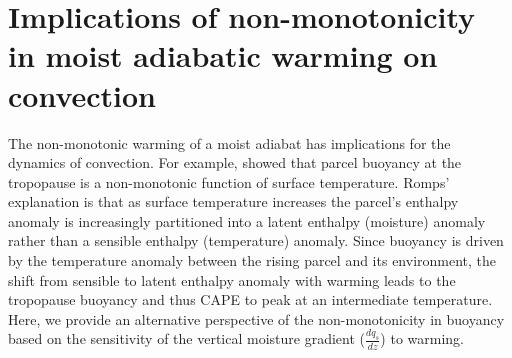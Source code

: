\documentclass{ametsocV6.1}
\begin{document}
\section{Implications of non-monotonicity in moist adiabatic warming on convection}
The non-monotonic warming of a moist adiabat has implications for the dynamics of convection. For example, \cite{romps2016} showed that parcel buoyancy at the tropopause is a non-monotonic function of surface temperature. Romps' explanation is that as surface temperature increases the parcel's enthalpy anomaly is increasingly partitioned into a latent enthalpy (moisture) anomaly rather than a sensible enthalpy (temperature) anomaly. Since buoyancy is driven by the temperature anomaly between the rising parcel and its environment, the shift from sensible to latent enthalpy anomaly with warming leads to the tropopause buoyancy and thus CAPE to peak at an intermediate temperature. Here, we provide an alternative perspective of the non-monotonicity in buoyancy based on the sensitivity of the vertical moisture gradient ($\frac{dq_s}{dz}$) to warming.
\end{document}
